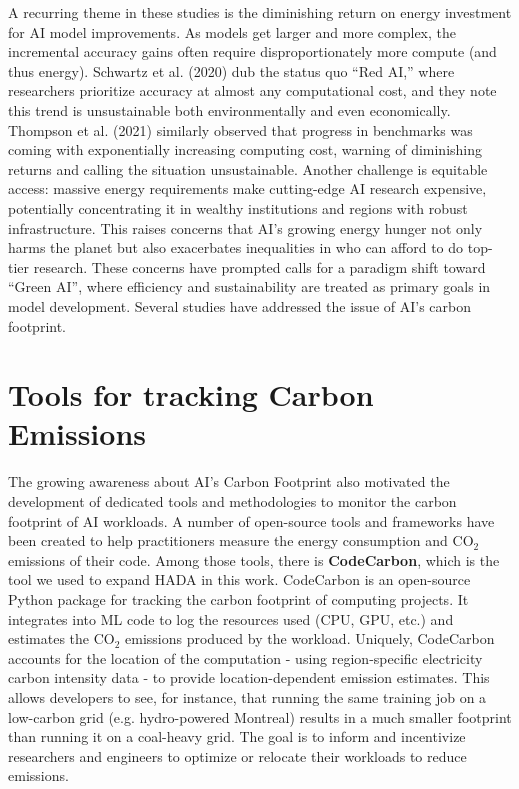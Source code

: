 \documentclass[a4paper,singleside,12pt]{report} %
\begin{document}
A recurring theme in these studies is the diminishing return on energy investment for AI model improvements.
As models get larger and more complex, the incremental accuracy gains often require disproportionately more 
compute (and thus energy). Schwartz et al. (2020) \cite{GreenAI} dub the status quo “Red AI,” where 
researchers prioritize accuracy at almost any computational cost, and they note this trend is unsustainable 
both environmentally and even economically. Thompson et al. (2021) \cite{thompson2021deeplearning} similarly
observed that progress in benchmarks was coming with exponentially increasing computing cost, warning of 
diminishing returns and calling the situation unsustainable. Another challenge is equitable access: massive 
energy requirements make cutting-edge AI research expensive, potentially concentrating it in wealthy 
institutions and regions with robust infrastructure. This raises concerns that AI's growing energy hunger 
not only harms the planet but also exacerbates inequalities in who can afford to do top-tier research. These 
concerns have prompted calls for a paradigm shift toward “Green AI”, where efficiency and sustainability are 
treated as primary goals in model development. Several studies have addressed the issue of AI's carbon 
footprint. 

\section{Tools for tracking Carbon Emissions}

The growing awareness about AI's Carbon Footprint also motivated the development of dedicated tools and
methodologies to monitor the carbon footprint of AI workloads. A number of open-source tools and frameworks
have been created to help practitioners measure the energy consumption and $\mathrm{CO_2}$ emissions of their
code. Among those tools, there is \textbf{CodeCarbon}, which is the tool we used to expand HADA in this work.
CodeCarbon is an open-source Python package for tracking the carbon footprint  of computing projects. It 
integrates into ML code to log the resources used (CPU, GPU, etc.) and estimates the $\mathrm{CO_2}$ emissions
produced by the workload. Uniquely, CodeCarbon accounts for the location of the computation - using 
region-specific electricity carbon intensity data - to provide location-dependent emission estimates. 
This allows developers to see, for instance, that running the same training job on a low-carbon grid 
(e.g. hydro-powered Montreal) results in a much smaller footprint than running it on a coal-heavy grid. 
The goal is to inform and incentivize researchers and engineers to optimize or relocate their workloads to 
reduce emissions.
\end{document}
